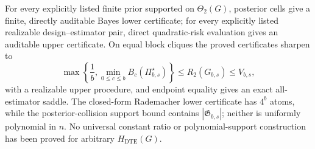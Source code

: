 For every explicitly listed finite prior supported on \(\Theta_2(G)\), posterior cells give a finite, directly auditable Bayes lower certificate; for every explicitly listed realizable design--estimator pair, direct quadratic-risk evaluation gives an auditable upper certificate.  On equal block cliques the proved certificates sharpen to
\[
\max\left\{\frac1b,\min_{0\leq c\leq b}B_c(\Pi_{b,s}^{\star})\right\}
\leq R_2(G_{b,s})\leq V_{b,s},
\]
with a realizable upper procedure, and endpoint equality gives an exact all-estimator saddle.  The closed-form Rademacher lower certificate has \(4^b\) atoms, while the posterior-collision support bound contains \(|\mathfrak G_{b,s}|\); neither is uniformly polynomial in \(n\).  No universal constant ratio or polynomial-support construction has been proved for arbitrary \(H_{\mathrm{DTE}}(G)\).